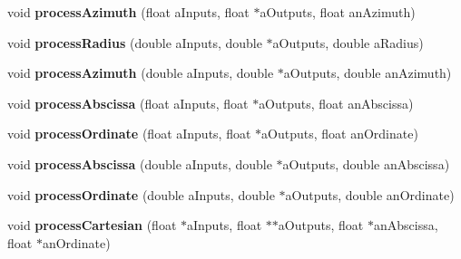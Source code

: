 \begin{DoxyCompactItemize}
\item 
\hypertarget{class_ambisonics_multi_maps_ad0f68d09fd49dd5b8571dcc6736a301c}{void {\bfseries process\-Azimuth} (float a\-Inputs, float $\ast$a\-Outputs, float an\-Azimuth)}\label{class_ambisonics_multi_maps_ad0f68d09fd49dd5b8571dcc6736a301c}

\item 
\hypertarget{class_ambisonics_multi_maps_a9c47dbd0d4a562785843cd65f6e00988}{void {\bfseries process\-Radius} (double a\-Inputs, double $\ast$a\-Outputs, double a\-Radius)}\label{class_ambisonics_multi_maps_a9c47dbd0d4a562785843cd65f6e00988}

\item 
\hypertarget{class_ambisonics_multi_maps_aca539584e7f3c43043456e08d83987c1}{void {\bfseries process\-Azimuth} (double a\-Inputs, double $\ast$a\-Outputs, double an\-Azimuth)}\label{class_ambisonics_multi_maps_aca539584e7f3c43043456e08d83987c1}

\item 
\hypertarget{class_ambisonics_multi_maps_a785f59b9207bbcfcf02b06489930c345}{void {\bfseries process\-Abscissa} (float a\-Inputs, float $\ast$a\-Outputs, float an\-Abscissa)}\label{class_ambisonics_multi_maps_a785f59b9207bbcfcf02b06489930c345}

\item 
\hypertarget{class_ambisonics_multi_maps_aa46ce576639f7edb38447f61341b8fbb}{void {\bfseries process\-Ordinate} (float a\-Inputs, float $\ast$a\-Outputs, float an\-Ordinate)}\label{class_ambisonics_multi_maps_aa46ce576639f7edb38447f61341b8fbb}

\item 
\hypertarget{class_ambisonics_multi_maps_a759863c671babc71a1006e86341503dc}{void {\bfseries process\-Abscissa} (double a\-Inputs, double $\ast$a\-Outputs, double an\-Abscissa)}\label{class_ambisonics_multi_maps_a759863c671babc71a1006e86341503dc}

\item 
\hypertarget{class_ambisonics_multi_maps_a7b9443f181a3743efd6f5d20c7c36c20}{void {\bfseries process\-Ordinate} (double a\-Inputs, double $\ast$a\-Outputs, double an\-Ordinate)}\label{class_ambisonics_multi_maps_a7b9443f181a3743efd6f5d20c7c36c20}

\item 
\hypertarget{class_ambisonics_multi_maps_a43e20f87b6548d959b68039ae434f18d}{void {\bfseries process\-Cartesian} (float $\ast$a\-Inputs, float $\ast$$\ast$a\-Outputs, float $\ast$an\-Abscissa, float $\ast$an\-Ordinate)}\label{class_ambisonics_multi_maps_a43e20f87b6548d959b68039ae434f18d}


\end{DoxyCompactItemize}
